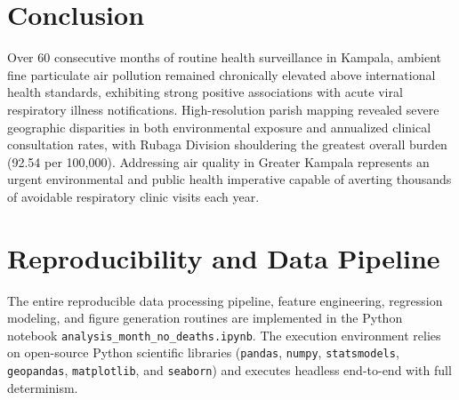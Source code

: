 \documentclass[12pt,a4paper]{report}
\begin{document}
\chapter{Conclusion}
Over 60 consecutive months of routine health surveillance in Kampala, ambient fine particulate air pollution remained chronically elevated above international health standards, exhibiting strong positive associations with acute viral respiratory illness notifications. High-resolution parish mapping revealed severe geographic disparities in both environmental exposure and annualized clinical consultation rates, with Rubaga Division shouldering the greatest overall burden (92.54 per 100,000). Addressing air quality in Greater Kampala represents an urgent environmental and public health imperative capable of averting thousands of avoidable respiratory clinic visits each year.

\appendix
\chapter{Reproducibility and Data Pipeline}
The entire reproducible data processing pipeline, feature engineering, regression modeling, and figure generation routines are implemented in the Python notebook \texttt{analysis\_month\_no\_deaths.ipynb}. The execution environment relies on open-source Python scientific libraries (\texttt{pandas}, \texttt{numpy}, \texttt{statsmodels}, \texttt{geopandas}, \texttt{matplotlib}, and \texttt{seaborn}) and executes headless end-to-end with full determinism.

\printbibliography
\end{document}
